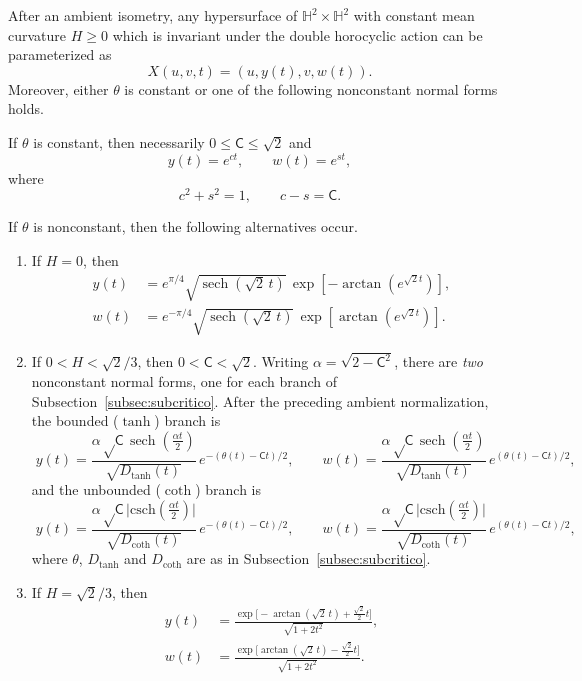 \documentclass[11pt,a4paper]{amsart}
\theoremstyle{plain}
\theoremstyle{remark}
\newcommand{\Hyp}{\mathbb{H}}
\newcommand{\C}{\mathsf{C}}
\DeclareMathOperator{\sech}{sech}
\begin{document}
\begin{corollary}\label{corMainthm} After an ambient isometry, any hypersurface of
$\Hyp^2\times\Hyp^2$ with constant mean curvature $H\geq 0$ which is
invariant under the double horocyclic action can be parameterized as
\[
X(u,v,t)=(u,y(t),v,w(t)).
\]
Moreover, either $\theta$ is constant or one of the following nonconstant
normal forms holds.

If $\theta$ is constant, then necessarily $0\leq \C\leq\sqrt2$ and
\[
y(t)=e^{ct},
\qquad
w(t)=e^{st},
\]
where
\[
c^2+s^2=1,
\qquad
c-s=\C.
\]

If $\theta$ is nonconstant, then the following alternatives occur.

\begin{enumerate}[label=\textup{(\roman*)},leftmargin=*]

\item If $H=0$, then
\begin{equation*}
\boxed{\;
\begin{aligned}
y(t)&=e^{\pi/4}\sqrt{\sech(\sqrt2\,t)}\,\exp\!\left[-\arctan\!\left(e^{\sqrt2 t}\right)\right],\\[2pt]
w(t)&=e^{-\pi/4}\sqrt{\sech(\sqrt2\,t)}\,\exp\!\left[\arctan\!\left(e^{\sqrt2 t}\right)\right].
\end{aligned}\;}
\end{equation*}

\item If $0<H<\sqrt2/3$, then $0<\C<\sqrt2$. Writing $\alpha=\sqrt{2-\C^2}$, there
are \emph{two} nonconstant normal forms, one for each branch of
Subsection~\ref{subsec:subcritico}. After the preceding ambient normalization, the bounded ($\tanh$) branch is
\[
\boxed{\;
y(t)=
\frac{\alpha\sqrt\C\,\sech(\tfrac{\alpha t}{2})}{\sqrt{D_{\tanh}(t)}}\,
e^{-(\theta(t)-\C t)/2},
\qquad
w(t)=
\frac{\alpha\sqrt\C\,\sech(\tfrac{\alpha t}{2})}{\sqrt{D_{\tanh}(t)}}\,
e^{(\theta(t)-\C t)/2},
\;}
\]
and the unbounded ($\coth$) branch is
\[
\boxed{\;
y(t)=
\frac{\alpha\sqrt\C\,\bigl|\mathrm{csch}(\tfrac{\alpha t}{2})\bigr|}{\sqrt{D_{\coth}(t)}}\,
e^{-(\theta(t)-\C t)/2},
\qquad
w(t)=
\frac{\alpha\sqrt\C\,\bigl|\mathrm{csch}(\tfrac{\alpha t}{2})\bigr|}{\sqrt{D_{\coth}(t)}}\,
e^{(\theta(t)-\C t)/2},}
\]
where $\theta$, $D_{\tanh}$ and $D_{\coth}$ are as in
Subsection~\ref{subsec:subcritico}.
\item If $H=\sqrt2/3$, then
\begin{equation*}
\boxed{\;
\begin{aligned}
y(t)
&=
\frac{
\exp\!\bigl[-\arctan(\sqrt2\,t)+\tfrac{\sqrt2}{2}t\bigr]}
{\sqrt{1+2t^2}},
\\[2pt]
w(t)
&=
\frac{
\exp\!\bigl[\arctan(\sqrt2\,t)-\tfrac{\sqrt2}{2}t\bigr]}
{\sqrt{1+2t^2}}.
\end{aligned}
\;}
\end{equation*}


\end{enumerate}
\end{corollary}
\end{document}
